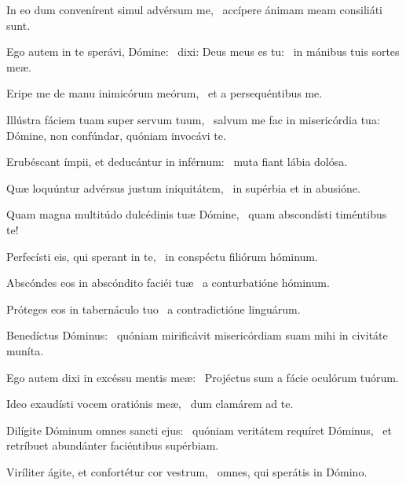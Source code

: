 \item In eo dum convenírent simul advérsum me,~\psstar{} accípere ánimam meam consiliáti sunt.

\item Ego autem in te sperávi, Dómine:~\pscross{} dixi: Deus meus es tu:~\psstar{} in mánibus tuis sortes meæ.

\item Eripe me de manu inimicórum meórum,~\psstar{} et a persequéntibus me.

\item Illústra fáciem tuam super servum tuum,~\pscross{} salvum me fac in misericórdia tua:~\psstar{} Dómine, non confúndar, quóniam invocávi te.

\item Erubéscant ímpii, et deducántur in inférnum:~\psstar{} muta fiant lábia dolósa.

\item Quæ loquúntur advérsus justum iniquitátem,~\psstar{} in supérbia et in abusióne.

\item Quam magna multitúdo dulcédinis tuæ Dómine,~\psstar{} quam abscondísti timéntibus te!

\item Perfecísti eis, qui sperant in te,~\psstar{} in conspéctu filiórum hóminum.

\item Abscóndes eos in abscóndito faciéi tuæ~\psstar{} a conturbatióne hóminum.

\item Próteges eos in tabernáculo tuo~\psstar{} a contradictióne linguárum.

\item Benedíctus Dóminus:~\psstar{} quóniam mirificávit misericórdiam suam mihi in civitáte muníta.

\item Ego autem dixi in excéssu mentis meæ:~\psstar{} Projéctus sum a fácie oculórum tuórum.

\item Ideo exaudísti vocem oratiónis meæ,~\psstar{} dum clamárem ad te.

\item Dilígite Dóminum omnes sancti ejus:~\pscross{} quóniam veritátem requíret Dóminus,~\psstar{} et retríbuet abundánter faciéntibus supérbiam.

\item Viríliter ágite, et confortétur cor vestrum,~\psstar{} omnes, qui sperátis in Dómino.

